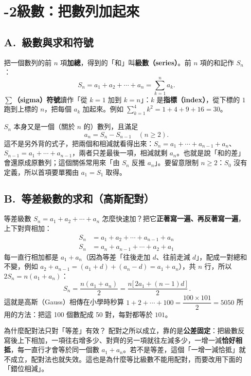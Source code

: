 \documentclass[11pt]{article}
\begin{document}
\section*{-2\quad 級數：把數列加起來}

\subsection*{\sffamily A.\ 級數與求和符號}

把一個數列的前 $n$ 項\textbf{加總}，得到的「和」叫\textbf{級數（series）}。前 $n$ 項的和記作 $S_n$：
$$
S_n=a_1+a_2+\cdots+a_n=\sum_{k=1}^{n}a_k .
$$
\textbf{$\sum$（sigma）符號}讀作「從 $k=1$ 加到 $k=n$」：$k$ 是\textbf{指標（index）}，從下標的 $1$ 跑到上標的 $n$，把每個 $a_k$ 加起來。例如 $\displaystyle\sum_{k=1}^{4}k^2=1+4+9+16=30$。

$S_n$ 本身又是一個（關於 $n$ 的）數列，且滿足
$$a_n=S_n-S_{n-1}\quad(n\ge2).$$
這不是另外背的式子，把兩個和相減就看得出來：$S_n=a_1+\cdots+a_{n-1}+a_n$、$S_{n-1}=a_1+\cdots+a_{n-1}$，兩者只差最後一項，相減就剩 $a_n$。也就是說「和的差」會還原成原數列；這個關係常用來「由 $S_n$ 反推 $a_n$」。要留意限制 $n\ge2$：$S_0$ 沒有定義，所以首項要單獨由 $a_1=S_1$ 取得。

\subsection*{\sffamily B.\ 等差級數的求和（高斯配對）}

等差級數 $S_n=a_1+a_2+\cdots+a_n$ 怎麼快速加？把它\textbf{正著寫一遍、再反著寫一遍}，上下對齊相加：
$$
\begin{aligned}
S_n &= a_1 + a_2 + \cdots + a_{n-1} + a_n\\
S_n &= a_n + a_{n-1} + \cdots + a_2 + a_1
\end{aligned}
$$
每一直行相加都是 $a_1+a_n$（因為等差「往後走加 $d$、往前走減 $d$」，配成一對總和不變，例如 $a_2+a_{n-1}=(a_1+d)+(a_n-d)=a_1+a_n$），共 $n$ 行，所以 $2S_n=n(a_1+a_n)$：
$$
\boxed{\,S_n=\frac{n(a_1+a_n)}{2}=\frac{n\bigl[\,2a_1+(n-1)d\,\bigr]}{2}\,}.
$$
這就是高斯（Gauss）相傳在小學時秒算 $1+2+\cdots+100=\dfrac{100\times101}{2}=5050$ 所用的方法：把這 100 個數配成 50 對，每對都等於 $101$。


\begin{補充框}{為什麼配對法只對「等差」有效？}
配對之所以成立，靠的是\textbf{公差固定}：把級數反寫後上下相加，一項往右增多少、對齊的另一項就往左減多少，一增一減\textbf{恰好相抵}，每一直行才會等於同一個數 $a_1+a_n$。若不是等差，這個「一增一減恰抵」就不成立，配對法也就失效。這也是為什麼等比級數不能用配對，而要改用下面的「錯位相減」。
\end{補充框}
\end{document}
